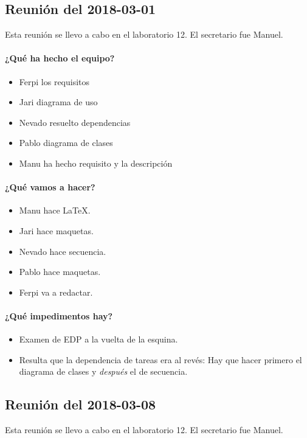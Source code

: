 \documentclass[a4paper, 12pt, spanish]{memoria}
\begin{document}
\subsection*{Reunión del 2018-03-01}
Esta reunión se llevo a cabo en el laboratorio 12. El secretario fue Manuel.

\paragraph{¿Qué ha hecho el equipo?}
\begin{itemize}
    \item Ferpi los requisitos
    \item Jari diagrama de uso
    \item Nevado resuelto dependencias
    \item Pablo diagrama de clases
    \item Manu ha hecho requisito y la descripción
\end{itemize}

\paragraph{¿Qué vamos a hacer?}
\begin{itemize}
        \item Manu hace \LaTeX.
        \item Jari hace maquetas.
        \item Nevado hace secuencia.
        \item Pablo hace maquetas.
        \item Ferpi va a redactar.
\end{itemize}
\paragraph{¿Qué impedimentos hay?}
\begin{itemize}
  \item Examen de EDP a la vuelta de la esquina.
  \item Resulta que la dependencia de tareas era al revés: \newline
    Hay que hacer primero el diagrama de clases y \textit{después} el de secuencia.
\end{itemize}


\subsection*{Reunión del 2018-03-08}
Esta reunión se llevo a cabo en el laboratorio 12. El secretario fue Manuel.
\end{document}
